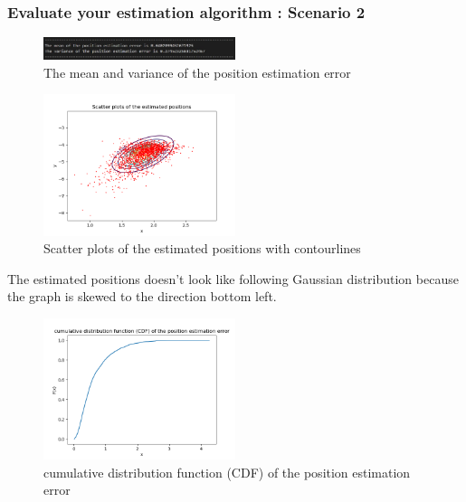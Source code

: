 \documentclass[a4paper]{article}
\begin{document}
\clearpage
\subsubsection{Evaluate your estimation algorithm : Scenario 2}
\begin{figure}[h]
	\begin{center}
		\includegraphics[width=0.5\textwidth]{mean_variance_error2.jpg}
		\caption{The mean and variance of the position estimation error}
	\end{center}
\end{figure}
\begin{figure}[h]
	\begin{center}
		\includegraphics[width=0.5\textwidth]{plotcon2.png}
		\caption{Scatter plots of the estimated positions with contourlines}
	\end{center}
\end{figure}
The estimated positions doesn't look like following Gaussian distribution because the graph is skewed to the direction bottom left.
\begin{figure}[h]
	\begin{center}		
		\includegraphics[width=0.5\textwidth]{CDF2.png}
		\caption{cumulative distribution function (CDF) of the position estimation error}
	\end{center}
\end{figure}
\end{document}
